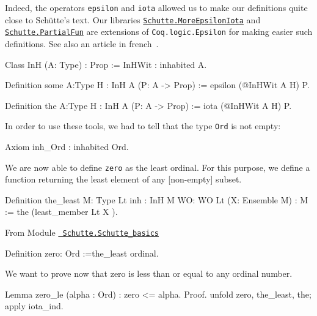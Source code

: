 Indeed, the operators \texttt{epsilon} and \texttt{iota} allowed us to make our definitions 
quite close to Schütte's text. Our libraries \href{../theories/html/hydras.Schutte.MoreEpsilonIota.html}%
{\texttt{Schutte.MoreEpsilonIota}}
and
\href{../theories/html/hydras.Schutte.PartialFun.html}%
{\texttt{Schutte.PartialFun}} are extensions of \texttt{Coq.logic.Epsilon} for making easier 
such definitions. See also an article in french~\cite{PCiota}. 



\begin{Coqsrc}
Class InH (A: Type) : Prop :=
   InHWit : inhabited A.

Definition some {A:Type} {H : InH A} (P: A -> Prop) := 
   epsilon (@InHWit A H) P.

Definition the {A:Type} {H : InH A} (P: A -> Prop) := 
   iota (@InHWit A H) P.
\end{Coqsrc}

In order to use these tools,  we had to tell \coq{}  that the type \texttt{Ord} is not empty:

\begin{Coqsrc}
Axiom inh_Ord : inhabited Ord.
\end{Coqsrc}


We are now able to define \texttt{zero} as the least ordinal. For this purpose,
we define a function returning the least element of any [non-empty]  subset.


\begin{Coqsrc}
Definition the_least {M: Type} {Lt}
           {inh : InH M} {WO: WO Lt} (X: Ensemble M)  : M :=
  the  (least_member  Lt X ).
\end{Coqsrc}


\vspace{4pt}

From Module \href{../theories/html/hydras.Schutte.Schutte_basics.html}%
{\texttt{~Schutte.Schutte\_basics}}

\label{Constants:zero:Ord}

\begin{Coqsrc}
Definition zero: Ord :=the_least ordinal.
\end{Coqsrc}

We want to prove now that zero is less than or equal to any ordinal number.

\begin{Coqsrc}
Lemma zero_le (alpha : Ord) :  zero <= alpha.
Proof.
  unfold zero, the_least, the; apply iota_ind.
\end{Coqsrc}


